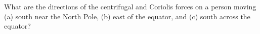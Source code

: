 \documentclass[../main.tex]{subfiles}
\begin{document}
\begin{problema}
	What are the directions of the centrifugal and Coriolis forces on a
	person moving (a) south near the North Pole, (b) east of the equator,
	and (c) south across the equator?
\end{problema}
\end{document}
